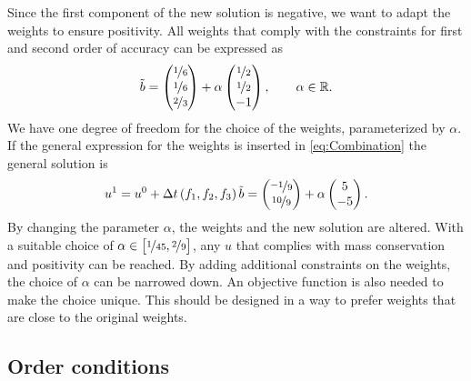 \documentclass[a4paper]{article}
\numberwithin{equation}{section}
\theoremstyle{plain}
\theoremstyle{definition}
\numberwithin{theorem}{section}
\newcommand{\R}{\mathbb{R}}
\newcommand{\dt}{{\Delta t}}
\newcommand{\1}{\mathbbm{1}}
\newcommand{\bt}{\tilde{b}}
\begin{document}
Since the first component of the new solution is negative,
we want to adapt the weights to ensure positivity.
All weights that comply with the constraints for first and second
order of accuracy can be expressed as
\begin{equation}
  \bt =
  \begin{pmatrix}
    \nicefrac{1}{6} \\
    \nicefrac{1}{6} \\
    \nicefrac{2}{3}
  \end{pmatrix}
  + \alpha \begin{pmatrix}
    \nicefrac{1}{2} \\
    \nicefrac{1}{2} \\
    -1
  \end{pmatrix},
  \qquad
  \alpha \in \R.
\end{equation}
We have one degree of freedom for the choice of the weights,
parameterized by $\alpha$.
If the general expression for the weights is inserted in
\eqref{eq:Combination} the general solution is
\begin{equation}
  u^{1}
  =
  u^0 + \dt \left(f_1, f_2, f_3\right) \bt
  =
  \begin{pmatrix}
    \nicefrac{-1}{9} \\
    \nicefrac{10}{9}
  \end{pmatrix}
  +\alpha \begin{pmatrix}
    5 \\
    -5
  \end{pmatrix}.
\end{equation}
By changing the parameter $\alpha$, the weights and the new
solution are altered. With a suitable choice of
$\alpha \in \left[ \nicefrac{1}{45}, \nicefrac{2}{9} \right]$,
any $u$ that complies with mass conservation and positivity can
be reached.
By adding additional constraints on the weights, the choice of
$\alpha$ can be narrowed down.
An objective function is also needed to make the choice unique. This should be designed in a way to prefer weights that are close to the original weights.


\subsection{Order conditions}\label{sec:OrderCond}
\end{document}
